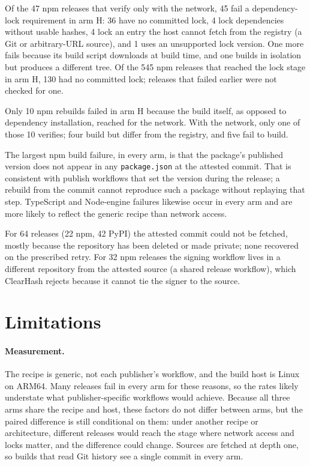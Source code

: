 \documentclass[11pt]{article}
\begin{document}
Of the 47 npm releases that verify only with the network, 45 fail a
dependency-lock requirement in arm H: 36 have no committed lock, 4 lock
dependencies without usable hashes, 4 lock an entry the host cannot fetch
from the registry (a Git or arbitrary-URL source), and 1 uses an
unsupported lock version. One more fails because its build script
downloads at build time, and one builds in isolation but produces a
different tree. Of the 545 npm releases that reached the lock stage in
arm H, 130 had no committed lock; releases that failed earlier were not
checked for one.

Only 10 npm rebuilds failed in arm H because the build itself, as
opposed to dependency installation, reached for the network. With the
network, only one of those 10 verifies; four build but differ from the
registry, and five fail to build.

The largest npm build failure, in every arm, is that the package's
published version does not appear in any \texttt{package.json} at the
attested commit. That is consistent with publish workflows that set the
version during the release; a rebuild from the commit cannot reproduce
such a package without replaying that step. TypeScript and Node-engine
failures likewise occur in every arm and are more likely to reflect the
generic recipe than network access.

For 64 releases (22 npm, 42 PyPI) the attested commit could not be
fetched, mostly because the repository has been deleted or made private;
none recovered on the prescribed retry. For 32 npm releases the signing
workflow lives in a different repository from the attested source (a
shared release workflow), which ClearHash rejects because it cannot tie
the signer to the source.

\section{Limitations}

\paragraph{Measurement.} The recipe is generic, not each publisher's
workflow, and the build host is Linux on ARM64. Many releases fail in
every arm for these reasons, so the rates likely understate what
publisher-specific workflows would achieve. Because all three arms share
the recipe and host, these factors do not differ between arms, but the
paired difference is still conditional on them: under another recipe or
architecture, different releases would reach the stage where network
access and locks matter, and the difference could change. Sources are
fetched at depth one, so builds that read Git history see a single
commit in every arm.
\end{document}
